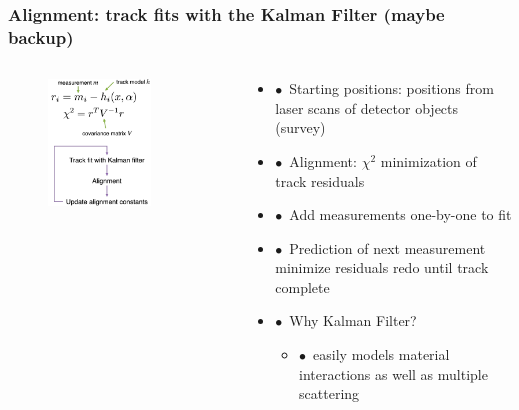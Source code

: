 \documentclass[aspectratio=1610, 12pt, xcolor=dvipsnames]{beamer}
\begin{document}
\begin{frame}\frametitle{Alignment: track fits with the Kalman Filter (maybe backup)}
  \begin{columns}
    \begin{column}[c]{0.4\textwidth}
      \begin{figure}
        \centering
        \includegraphics[width=0.72\textwidth]{logos/kalman.png}
      \end{figure}
    \end{column}
    \begin{column}[c]{0.55\textwidth}
      \begin{itemize}
        \item $\bullet$\, Starting positions: positions from laser scans of detector objects (survey)
        \item $\bullet$\, Alignment: $\chi^2$ minimization of track residuals
        \item $\bullet$\, Add measurements one-by-one to fit
        \item $\bullet$\, Prediction of next measurement \to minimize residuals \to redo until track complete
        \item $\bullet$\, Why Kalman Filter?
        \begin{itemize}
          \item $\bullet$\, easily models material interactions as well as multiple scattering
        \end{itemize}
      \end{itemize}
    \end{column}
  \end{columns}
\end{frame}
\end{document}
